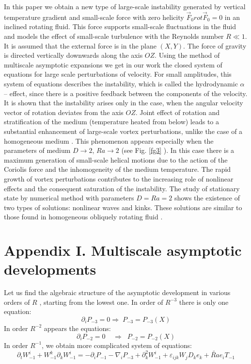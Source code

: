 \documentclass [12pt]{article}
\begin{document}
In this paper we obtain a new type of large-scale instability generated by vertical temperature gradient and small-scale force with zero helicity $\vec{F}_{0} rot\vec{F}_{0} =0$ in an inclined rotating fluid. This force supports small-scale fluctuations in the fluid and models the effect of small-scale turbulence with the Reynolds number $R \ll1$. It is assumed that the external force is in the plane $(X,Y)$. The force of gravity is directed vertically downwards along the axis  $OZ$. Using the method of multiscale asymptotic expansions we get in our work the closed system of equations for large scale perturbations of velocity. For small amplitudes, this system of equations describes the instability, which is called the hydrodynamic $\alpha $ -- effect, since there is a positive feedback between the components of the velocity. It is shown that the instability arises only in the case, when the angular velocity vector of rotation deviates from the axis $OZ$. Joint effect of rotation and stratification of the medium (temperature heated from below) leads to a substantial enhancement of large-scale vortex perturbations, unlike the case of a homogeneous medium \cite{21s}. This phenomenon appears especially when the parameters of medium $D \to 2$,  $Ra\to 2$  (see Fig. \ref{fg3} ). In this case there is a maximum generation of small-scale helical motions due to the action of the Coriolis force and the inhomogeneity of the medium temperature. The rapid growth of vortex perturbations contributes to the increasing role of nonlinear effects and the consequent saturation of the instability. The study of stationary state by numerical method with parameters $D=Ra=2$ shows the existence of two types of solutions: nonlinear waves and kinks. These solutions are similar to those found in homogeneous obliquely rotating fluid \cite{21s}.

\section*{Appendix I. Multiscale asymptotic developments}

Let us find the algebraic structure of the asymptotic development in various orders of $R$ , starting from the lowest one. In order of $R^{-3} $ there is only one equation:
\begin{equation}\label{eqI1} \partial _{i} P_{-3} =0\Rightarrow \; P_{-3} =P_{-3} \left(X\right) \end{equation}
In order $R^{-2}$ appears the equations:
\begin{equation}\label{eqI2}\partial _{i} P_{-2} =0\; \; \; \; \Rightarrow \; \; P_{-2} =P_{-2} \left(X\right) \end{equation}
In order  $R^{-1}$, we obtain more complicated system of equations:
\begin{equation}\label{eqI3} \partial _{t} W_{-1}^{i} +W_{-1}^{k} \partial _{k} W_{-1}^{i} =-\partial _{i} P_{-1}
-\nabla _{i} P_{-3} +\partial _{k}^{2} W_{-1}^{i} +\varepsilon _{ijk} W_{j} D_{k}
e_{k} +\widetilde{Ra}e_{i} T_{-1}  \end{equation}
\end{document}
